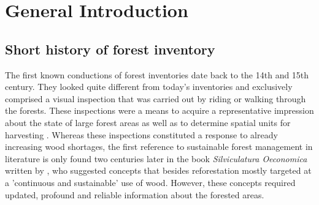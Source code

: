	

			
	

	
\chapter{General Introduction}
\label{chap:intro}
\newpage
\section{Short history of forest inventory}
\label{sec:intro:hist_soa}

The first known conductions of forest inventories date back to the 14th and 15th century. They looked quite different from today's inventories and exclusively comprised a visual inspection that was carried out by riding or walking through the forests. These inspections were a means to acquire a representative impression about the state of large forest areas as well as to determine spatial units for harvesting \citep{zoehrer1980}. Whereas these inspections constituted a response to already increasing wood shortages, the first reference to sustainable forest management in literature is only found two centuries later in the book \textit{Silviculatura Oeconomica} written by \citet{carlowitz1713}, who suggested concepts that besides reforestation mostly targeted at a 'continuous and sustainable' use of wood. However, these concepts required updated, profound and reliable information about the forested areas.\par

